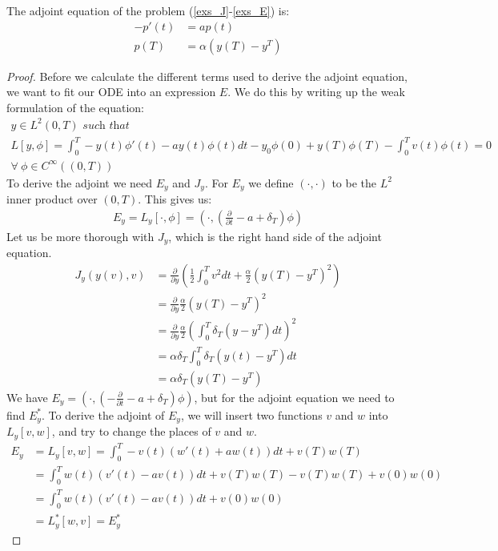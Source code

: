 \begin{theorem}
The adjoint equation of the problem (\ref{exs_J}-\ref{exs_E}) is:
\begin{align*}     
-p'(t) &= ap(t) \\
p(T) &= \alpha(y(T)-y^T)     
\end{align*}
\end{theorem}
\begin{proof}
Before we calculate the different terms used to derive the adjoint equation, we want to fit our ODE into an expression $E$. We do this by writing up the weak formulation of the equation:
\begin{gather*}
\textit{$y \in L^2(0,T)$ such that}\\
L[y,\phi] = \int_0^T-y(t)\phi'(t)-ay(t)\phi(t)dt -y_0\phi(0)+y(T)\phi(T)-\int_0^Tv(t)\phi(t)=0\\ \forall \ \phi \in C^{\infty}((0,T))
\end{gather*}
To derive the adjoint we need $E_y$ and $J_y$. For $E_y$ we define $(\cdot,\cdot)$ to be the $L^2$ inner product over $(0,T)$. This gives us:
\begin{align*}
E_y=L_y[\cdot,\phi]=(\cdot,(\frac{\partial}{\partial t} - a + \delta_T)\phi)  
\end{align*}
Let us be more thorough with $J_y$, which is the right hand side of the adjoint equation.
\begin{align*}
J_y(y(v),v) &= \frac{\partial}{\partial y}(\frac{1}{2}\int_0^Tv^2dt + \frac{\alpha}{2}(y(T)-y^T)^2) \\ &= \frac{\partial}{\partial y} \frac{\alpha}{2}(y(T)-y^T)^2 \\
&= \frac{\partial}{\partial y}\frac{\alpha}{2}(\int_0^T \delta_T(y-y^T)dt)^2 \\
&= \alpha\delta_T\int_0^T \delta_T(y(t)-y^T)dt \\
&= \alpha\delta_T(y(T)-y^T)
\end{align*}
We have $E_y=(\cdot,(-\frac{\partial}{\partial t} - a + \delta_T)\phi)$, but for the adjoint equation we need to find $E_y^*$.
To derive the adjoint of $E_y$, we will insert two functions $v$ and $w$ into $L_y[v,w]$, and try to change the places of $v$ and $w$.
\begin{align*}
E_y&=L_y[v,w]=\int_0^T-v(t)(w'(t)+aw(t))dt + v(T)w(T) \\
&=\int_0^Tw(t)(v'(t)-av(t))dt + v(T)w(T)-v(T)w(T) +v(0)w(0) \\
&=\int_0^Tw(t)(v'(t)-a v(t))dt+v(0)w(0) \\
&=L_y^*[w,v]=E_y^*

\end{align*}
\end{proof}

